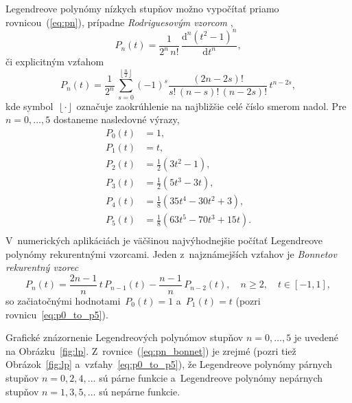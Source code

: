 \documentclass[a4paper, 12pt]{book}
\newcommand{\diff}{\mathrm d}
\begin{document}
Legendreove polynómy nízkych stupňov možno vypočítať priamo
rovnicou~(\ref{eq:pn}), prípadne \emph{Rodriguesovým vzorcom}
\parencite{SansoGeoidDetermination},
%
\begin{equation}
\label{eq:pn_rodrigues}
P_n(t) = \frac{1}{2^n \, n!} \, \frac{\diff^n (t^2 - 1)^n}{\diff t^n}{,}
\end{equation}
%
či explicitným vzťahom \parencite{Freeden2009}
%
\begin{equation}
P_n(t) = \frac{1}{2^n} \, \sum_{s = 0}^{\left\lfloor \frac{n}{2} \right\rfloor}
(-1)^s \frac{(2n - 2s)!}{s!  \, (n - s)! \, (n - 2s)!} \, t^{n - 2s}{,}
\end{equation}
%
kde symbol~$\left\lfloor \cdot \right\rfloor$ označuje zaokrúhlenie na
najbližšie celé číslo smerom nadol.  Pre $n = 0, \dots, 5$ dostaneme nasledovné
výrazy,
%
\begin{equation}
\label{eq:p0_to_p5}
\begin{split}
P_0(t) & = 1{,}\\
P_1(t) & = t{,}\\
P_2(t) & = \frac{1}{2} \left( 3t^2  - 1 \right){,}\\
P_3(t) & = \frac{1}{2} (5t^3 - 3t){,}\\
P_4(t) & = \frac{1}{8}(35t^4 - 30t^2 + 3){,}\\
P_5(t) & = \frac{1}{8}(63t^5 - 70t^3 + 15t){.}\\
\end{split}
\end{equation}
%
V~numerických aplikáciách je väčšinou najvýhodnejšie počítať Legendreove 
polynómy rekurentnými vzorcami.  Jeden z~najznámejších vzťahov je 
\emph{Bonnetov rekurentný vzorec}
%
\begin{equation}
\label{eq:pn_bonnet}
P_n(t) = \frac{2n - 1}{n} \, t \, P_{n - 1}(t) - \frac{n - 1}{n} \, P_{n
- 2}(t){,} \quad n \geq 2{,} \quad t \in [-1, 1]{,}
\end{equation}
%
so začiatočnými hodnotami~$P_0(t) = 1$ a~$P_1(t) = t$ (pozri
rovnicu~\ref{eq:p0_to_p5}).

Grafické znázornenie Legendreových polynómov stupňov $n =0, \dots, 5$ je
uvedené na Obrázku~\ref{fig:lp}.  Z~rovnice~(\ref{eq:pn_bonnet}) je zrejmé
(pozri tiež Obrázok~\ref{fig:lp} a~vzťahy~\ref{eq:p0_to_p5}), že Legendreove
polynómy párnych stupňov $n = 0, 2, 4, \dots$ sú párne funkcie a~Legendreove
polynómy nepárnych stupňov $n = 1, 3, 5, \dots$ sú nepárne funkcie.
\end{document}
